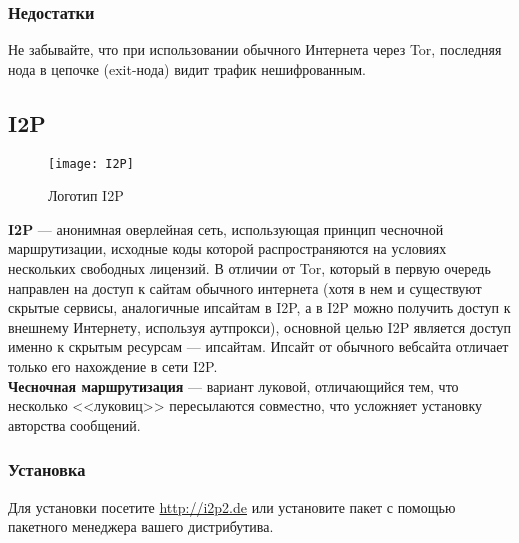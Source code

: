 \subsubsection{Недостатки}
\begin{important}
Не забывайте, что при использовании обычного Интернета через Tor, последняя нода в цепочке (exit-нода) видит трафик нешифрованным.
\end{important}
\subsection{I2P}
\begin{wrapfigure}[6]{r}{0.25\linewidth}
\texttt{[image: I2P]}
\caption{Логотип I2P}
\end{wrapfigure}
\textbf{I2P} --- анонимная оверлейная сеть, использующая принцип чесночной маршрутизации, исходные коды которой распространяются на условиях нескольких свободных лицензий\cite{i2p_license}. В отличии от Tor, который в первую очередь направлен на доступ к сайтам обычного интернета (хотя в нем и существуют скрытые сервисы, аналогичные ипсайтам в I2P, а в I2P можно получить доступ к внешнему Интернету, используя аутпрокси), основной целью I2P является доступ именно к скрытым ресурсам --- ипсайтам. Ипсайт от обычного вебсайта отличает только его нахождение в сети I2P.\\
\textbf{Чесночная маршрутизация} --- вариант луковой, отличающийся тем, что несколько <<луковиц>> пересылаются совместно, что усложняет установку авторства сообщений.
\subsubsection{Установка}
Для установки посетите \url{http://i2p2.de} или установите пакет с помощью пакетного менеджера вашего дистрибутива.
